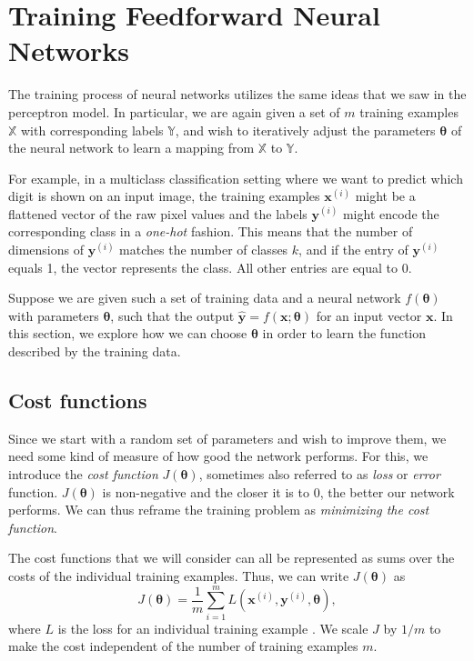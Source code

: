 \section{Training Feedforward Neural Networks}
\label{sec:training}
The training process of neural networks utilizes the same ideas that we saw in the perceptron model. In particular, we are again given a set of $m$ training examples $\mathbb{X}$ with corresponding labels $\mathbb{Y}$, and wish to iteratively adjust the parameters $\bm{\theta}$ of the neural network to learn a mapping from $\mathbb{X}$ to $\mathbb{Y}$.

For example, in a multiclass classification setting where we want to predict which digit is shown on an input image, the training examples $\bm{x}^{(i)}$ might be a flattened vector of the raw pixel values and the labels $\bm{y}^{(i)}$ might encode the corresponding class in a \emph{one-hot} fashion. This means that the number of dimensions of $\bm{y}^{(i)}$ matches the number of classes $k$, and if the  entry of $\bm{y}^{(i)}$ equals 1, the vector represents the  class. All other entries are equal to 0.

Suppose we are given such a set of training data and a neural network $f(\bm{\theta})$ with parameters $\bm{\theta}$, such that the output $\hat{\bm{y}} = f(\bm{x}; \bm{\theta})$ for an input vector $\bm{x}$. In this section, we explore how we can choose $\bm{\theta}$ in order to learn the function described by the training data.

\subsection{Cost functions}
Since we start with a random set of parameters and wish to improve them, we need some kind of measure of how good the network performs. For this, we introduce the \emph{cost function} $J(\bm{\theta})$, sometimes also referred to as \emph{loss} or \emph{error} function. $J(\bm{\theta})$ is non-negative and the closer it is to 0, the better our network performs. We can thus reframe the training problem as \emph{minimizing the cost function}.

The cost functions that we will consider can all be represented as sums over the costs of the individual training examples. Thus, we can write $J(\bm{\theta})$ as
\begin{equation}
J(\bm{\theta}) = \frac1{m}\sum_{i=1}^{m}L(\bm{x}^{(i)},\bm{y}^{(i)},\bm{\theta}),
\end{equation}
where $L$ is the loss for an individual training example \cite[Ch.\,5,\,pp.\,147-148]{DBLP:books/daglib/0040158}. We scale $J$ by $1/m$ to make the cost independent of the number of training examples $m$.

